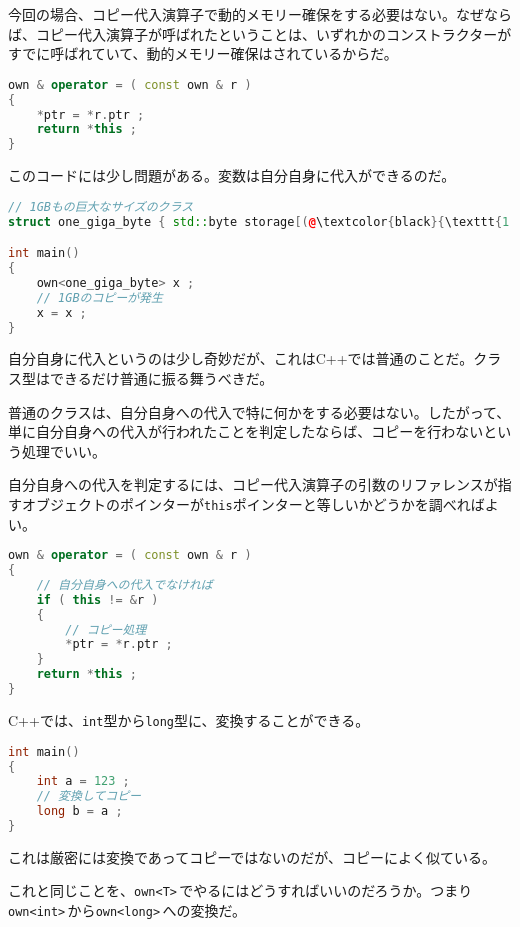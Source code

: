 今回の場合、コピー代入演算子で動的メモリー確保をする必要はない。なぜならば、コピー代入演算子が呼ばれたということは、いずれかのコンストラクターがすでに呼ばれていて、動的メモリー確保はされているからだ。

\begin{lstlisting}[language={C++}]
own & operator = ( const own & r )
{
    *ptr = *r.ptr ;
    return *this ;
}
\end{lstlisting}

このコードには少し問題がある。変数は自分自身に代入ができるのだ。

\begin{lstlisting}[language={C++}]
// 1GBもの巨大なサイズのクラス
struct one_giga_byte { std::byte storage[(@\textcolor{black}{\texttt{1'000'000'000}}@)] ; }

int main()
{
    own<one_giga_byte> x ;
    // 1GBのコピーが発生
    x = x ;
}
\end{lstlisting}

自分自身に代入というのは少し奇妙だが、これはC++では普通のことだ。クラス型はできるだけ普通に振る舞うべきだ。

普通のクラスは、自分自身への代入で特に何かをする必要はない。したがって、単に自分自身への代入が行われたことを判定したならば、コピーを行わないという処理でいい。

自分自身への代入を判定するには、コピー代入演算子の引数のリファレンスが指すオブジェクトのポインターが\texttt{this}ポインターと等しいかどうかを調べればよい。

\ifTombow\pagebreak\fi
\begin{lstlisting}[language={C++}]
own & operator = ( const own & r )
{
    // 自分自身への代入でなければ
    if ( this != &r )
    {
        // コピー処理
        *ptr = *r.ptr ;
    }
    return *this ;
}
\end{lstlisting}


C++では、\texttt{int}型から\texttt{long}型に、変換することができる。

\begin{lstlisting}[language={C++}]
int main()
{
    int a = 123 ;
    // 変換してコピー
    long b = a ;
}
\end{lstlisting}

これは厳密には変換であってコピーではないのだが、コピーによく似ている。

これと同じことを、\texttt{own<T>}\,でやるにはどうすればいいのだろうか。つまり\texttt{own<int>}\,から\texttt{own<long>}\,への変換だ。

